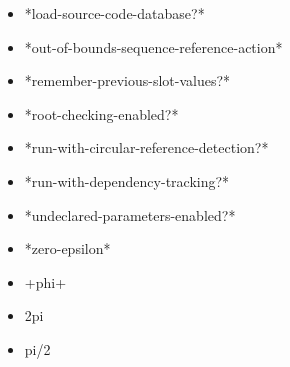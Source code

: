 \documentclass [11pt]{book}
\begin{document}
\begin{itemize}
\item {}*load-source-code-database?*





\item {}*out-of-bounds-sequence-reference-action*





\item {}*remember-previous-slot-values?*





\item {}*root-checking-enabled?*





\item {}*run-with-circular-reference-detection?*





\item {}*run-with-dependency-tracking?*





\item {}*undeclared-parameters-enabled?*





\item {}*zero-epsilon*





\item {}+phi+





\item {}2pi





\item {}pi/2





\end{itemize}
\end{document}
